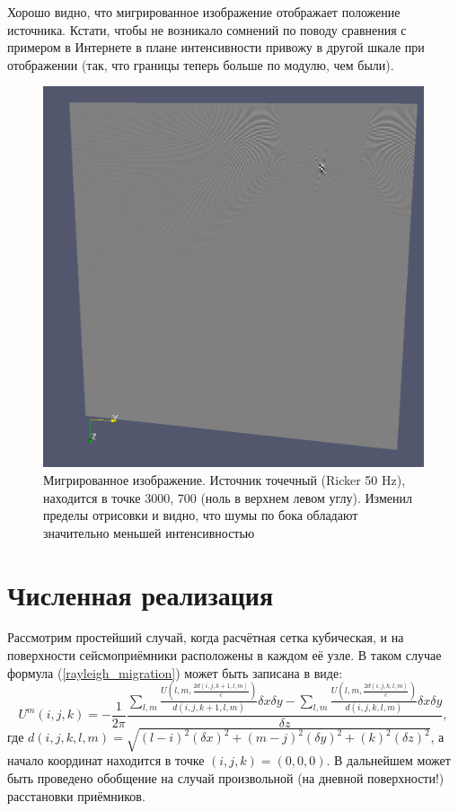 \documentclass{article}
\begin{document}
Хорошо видно, что мигрированное изображение отображает положение источника.
Кстати, чтобы не возникало сомнений по поводу сравнения с примером в Интернете в плане интенсивности привожу в другой шкале при отображении (так, что границы теперь больше по модулю, чем были).
\begin{figure}[ht]
  \center
  \includegraphics[scale=0.2]{pic/point_source_3000_700_val.png}
  \caption{Мигрированное изображение. Источник точечный (Ricker 50 Hz), находится в точке 3000, 700 (ноль в верхнем левом углу). Изменил пределы отрисовки и видно, что шумы по бока обладают значительно меньшей интенсивностью}
\label{comparison_3}
\end{figure}

\section{Численная реализация}

Рассмотрим простейший случай, когда расчётная сетка кубическая, и на поверхности сейсмоприёмники расположены в каждом её узле.
В таком случае формула (\ref{rayleigh_migration}) может быть записана в виде:
\begin{equation}
\label{rayleigh_migration_discrete}
U^m(i,j,k) = -\frac{1}{2\pi}\frac{\sum\limits_{l,m} \frac{U(l,m,\frac{2d(i,j,k+1,l,m)}{c})}{d(i,j,k+1,l,m)}\delta x \delta y - \sum\limits_{l,m} \frac{U(l,m,\frac{2d(i,j,k,l,m)}{c})}{d(i,j,k,l,m)}\delta x \delta y}{\delta z},
\end{equation}
где $d(i,j,k,l,m)=\sqrt{(l-i)^2(\delta x)^2 + (m-j)^2(\delta y)^2  + (k)^2(\delta z)^2}$, а начало координат находится в точке $(i,j,k)=(0,0,0)$.
В дальнейшем может быть проведено обобщение на случай произвольной (на дневной поверхности!) расстановки приёмников.
\end{document}
